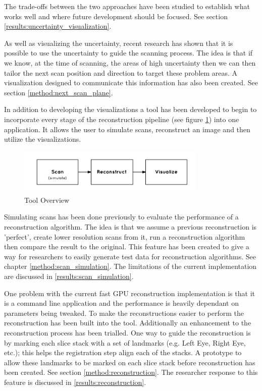 The trade-offs between the two approaches have been studied to establish what works well and where future development should be focused. See section \ref{results:uncertainty_visualization}.

As well as visualizing the uncertainty, recent research\cite{uncertaintysvd} has shown that it is possible to use the uncertainty to guide the scanning process. The idea is that if we know, at the time of scanning, the areas of high uncertainty then we can then tailor the next scan position and direction to target these problem areas. A visualization designed to communicate this information has also been created. See section \ref{method:next_scan_plane}.

In addition to developing the visualizations a tool has been developed to begin to incorporate every stage of the reconstruction pipeline (see figure \ref{fig:tool_overview}) into one application. It allows the user to simulate scans, reconstruct an image and then utilize the visualizations.

\begin{figure}[h]
    \centering
  \includegraphics[width=0.8\textwidth]{images/tool_overview.png}
    \caption{Tool Overview}\label{fig:tool_overview}
\end{figure}

Simulating scans has been done previously to evaluate the performance of a reconstruction algorithm\cite{uncertaintysvd}. The idea is that we  assume a previous reconstruction is 'perfect', create lower resolution scans from it, run a reconstruction algorithm then compare the result to the original. This feature has been created to give a way for researchers to easily generate test data for reconstruction algorithms. See chapter \ref{method:scan_simulation}. The limitations of the current implementation are discussed in \ref{results:scan_simulation}.

One problem with the current fast GPU reconstruction implementation\cite{gpureconstruction} is that it is a command line application and the performance is heavily dependant on parameters being tweaked. To make the reconstructions easier to perform the reconstruction has been built into the tool. Additionally an enhancement to the reconstruction process has been trialled. One way to guide the reconstruction is by marking each slice stack with a set of landmarks (e.g. Left Eye, Right Eye, etc.); this helps the registration step align each of the stacks. A prototype to allow these landmarks to be marked on each slice stack before reconstruction has been created. See section \ref{method:reconstruction}. The researcher response to this feature is discussed in \ref{results:reconstruction}.